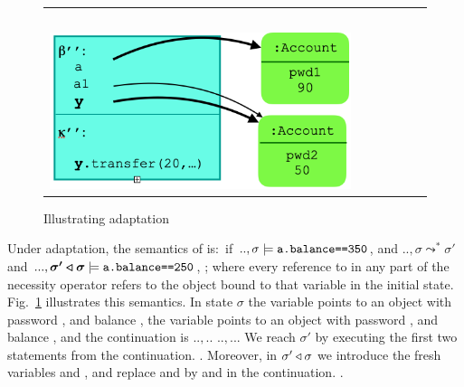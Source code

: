 \begin{figure}[htbp]
\begin{tabular}{clclc}
   & \ \ \  &
    \begin{minipage}{0.27\textwidth}
$\adapt {\sigma'}{\sigma}:$\\
  \includegraphics[width=\linewidth]{diagrams/adapt3.png}
   \end{minipage}
\end{tabular}
\caption{Illustrating adaptation
}
\label{fig:Adaptation}
\end{figure}




Under adaptation, the semantics of \Sadapt is:\  if $..,\sigma \models {\texttt{a.balance==350}}$,
and  $.., \sigma \leadsto^* \sigma'$ and $..., \boldsymbol{\sigma' \triangleleft \sigma} \models {\texttt{a.balance==250}}$,
;
where every reference to  in any part of the necessity operator
refers to the object bound to that variable in the initial state.
%
Fig.~\ref{fig:Adaptation} illustrates this semantics. In state $\sigma$ the variable  points to an 
object with password , and balance ,  the variable  points to an 
object with password , and balance , and the continuation is $..,..$\prg{);} 
$..,..$\prg{);}. 
We reach $\sigma'$ by executing the first two statements from the continuation.
.
Moreover, in $\sigma' \triangleleft \sigma$ we introduce the fresh variables  and , and replace  and
 by  and  in the continuation.
.

